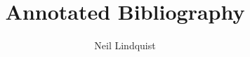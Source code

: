 \documentclass{article}
\title{Annotated Bibliography}
\author{Neil Lindquist}
\begin{document}
\maketitle

\nocite{*}



\end{document}
